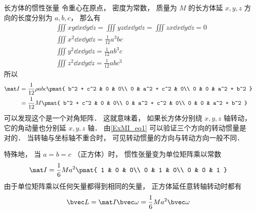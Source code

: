 \begin{example}{长方体的惯性张量}\label{ITensr_ex1}
令重心在原点， 密度为常数， 质量为 $M$ 的长方体延 $x, y, z$ 方向的长度分别为 $a, b, c$， 那么有
\begin{equation}
\begin{aligned}
&\iiint xy \dd{x}\dd{y}\dd{z} = \iiint yz \dd{x}\dd{y}\dd{z} = \iiint zx \dd{x}\dd{y}\dd{z} = 0\\
&\iiint x^2 \dd{x}\dd{y}\dd{z} = \frac{1}{12} a^3 bc\\
&\iiint y^2 \dd{x}\dd{y}\dd{z} = \frac{1}{12} ab^3 c\\
&\iiint z^2 \dd{x}\dd{y}\dd{z} = \frac{1}{12} ab c^3
\end{aligned}
\end{equation}
所以
\begin{equation}\label{ITensr_eq4}
\begin{aligned}
\mat I &= \frac{1}{12} \rho abc
\pmat{
   b^2 + c^2 & 0 & 0\\
   0 & a^2 + c^2 & 0\\
   0 & 0 & a^2 + b^2
}\\
&= \frac{1}{12} M
\pmat{
   b^2 + c^2 & 0 & 0\\
   0 & a^2 + c^2 & 0\\
   0 & 0 & a^2 + b^2
}
\end{aligned}
\end{equation}
可以发现这个是一个对角矩阵． 这就意味着， 如果长方体分别绕 $x, y, z$ 轴转动， 它的角动量也分别延 $x, y, z$ 轴． 由\autoref{ExMI_eq1} 可以验证三个方向的转动惯量是对的． 当转轴与坐标轴不重合时， 可见转动惯量的方向与转动方向一般不同．

特殊地， 当 $a = b = c$ （正方体）时， 惯性张量变为单位矩阵乘以常数
\begin{equation}
\mat I = \frac{1}{6} Ma^2
\pmat{
   1 & 0 & 0\\
   0 & 1 & 0\\
   0 & 0 & 1
}
\end{equation}
由于单位矩阵乘以任何矢量都得到相同的矢量， 正方体延任意转轴转动时都有
\begin{equation}
\bvec L = \mat I \bvec \omega = \frac{1}{6} Ma^2 \bvec \omega
\end{equation}
\end{example}

